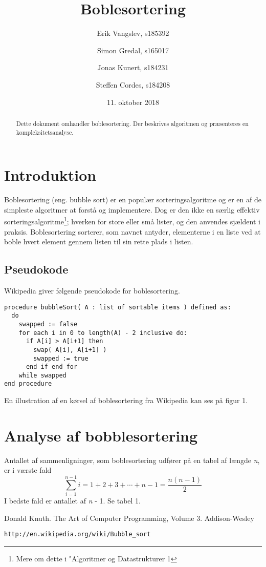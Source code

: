 \documentclass[a4paper]{article}
\begin{document}
\title{Boblesortering}
\author{
   Erik Vangslev, s185392
   \and
   Simon Gredal, s165017
   \and
   Jonas Kunert, s184231
   \and
   Steffen Cordes, s184208}
\date{11. oktober 2018}
\maketitle

\begin{abstract}
Dette dokument omhandler boblesortering. Der beskrives algoritmen og præsenteres en kompleksitetsanalyse.
\end{abstract}

\section{Introduktion}
Boblesortering (eng. bubble sort) er en populær sorteringsalgoritme og er en af de simpleste algoritmer at forstå og implementere. Dog er den ikke en særlig effektiv sorteringsalgoritme\footnote{Mere om dette i "Algoritmer og Datastrukturer 1}; hverken for store eller små lister, og den anvendes sjældent i praksis. Boblesortering sorterer, som navnet antyder, elementerne i en liste ved at boble hvert element gennem listen til sin rette plads i listen.

\subsection{Pseudokode}
Wikipedia \cite{WikiBubble} giver følgende pseudokode for boblesortering.

\begin{verbatim}
procedure bubbleSort( A : list of sortable items ) defined as:
  do
    swapped := false
    for each i in 0 to length(A) - 2 inclusive do:
      if A[i] > A[i+1] then
        swap( A[i], A[i+1] )
        swapped := true
      end if end for
    while swapped
end procedure
\end{verbatim}
En illustration af en kørsel af boblesortering fra Wikipedia kan ses på figur 1.

\section{Analyse af bobblesortering}
Antallet af sammenligninger, som boblesortering udfører på en tabel af længde \emph{n},
er i værste fald
\[ 
\displaystyle\sum_{i=1}^{n-1} i = 1 + 2 + 3 + \cdots + n - 1 = \frac{n(n - 1)}{2}
\]
I bedste fald er antallet af \emph{n} - 1. Se tabel 1.

\begin{thebibliography}{99}

  Donald Knuth.
  The Art of Computer Programming,
  Volume 3.
  Addison-Wesley

\begin{verbatim}
http://en.wikipedia.org/wiki/Bubble_sort
\end{verbatim}

\end{thebibliography}
\end{document}
